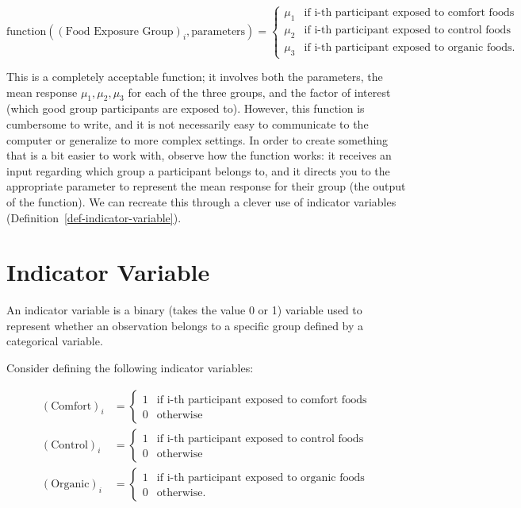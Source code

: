 \documentclass[
  letterpaper,
  DIV=11,
  numbers=noendperiod]{scrreprt}
\theoremstyle{definition}
\theoremstyle{definition}
\theoremstyle{plain}
\theoremstyle{remark}
\begin{document}
\[
\text{function}\left((\text{Food Exposure Group})_i, \text{parameters}\right) =
\begin{cases}
  \mu_1 & \text{if i-th participant exposed to comfort foods} \\
  \mu_2 & \text{if i-th participant exposed to control foods} \\
  \mu_3 & \text{if i-th participant exposed to organic foods.} 
\end{cases}
\]

This is a completely acceptable function; it involves both the
parameters, the mean response \(\mu_1, \mu_2, \mu_3\) for each of the
three groups, and the factor of interest (which good group participants
are exposed to). However, this function is cumbersome to write, and it
is not necessarily easy to communicate to the computer or generalize to
more complex settings. In order to create something that is a bit easier
to work with, observe how the function works: it receives an input
regarding which group a participant belongs to, and it directs you to
the appropriate parameter to represent the mean response for their group
(the output of the function). We can recreate this through a clever use
of indicator variables (Definition~\ref{def-indicator-variable}).

\hypertarget{indicator-variable-1}{%
\section{Indicator Variable}\label{indicator-variable-1}}

An indicator variable is a binary (takes the value 0 or 1) variable used
to represent whether an observation belongs to a specific group defined
by a categorical variable.

Consider defining the following indicator variables:

\[
\begin{aligned}
  (\text{Comfort})_i 
    &= \begin{cases} 1 & \text{if i-th participant exposed to comfort foods} \\ 0 & \text{otherwise} \end{cases} \\
  (\text{Control})_i 
    &= \begin{cases} 1 & \text{if i-th participant exposed to control foods} \\ 0 & \text{otherwise} \end{cases} \\
  (\text{Organic})_i 
    &= \begin{cases} 1 & \text{if i-th participant exposed to organic foods} \\ 0 & \text{otherwise}. \end{cases}
\end{aligned}
\]
\end{document}
